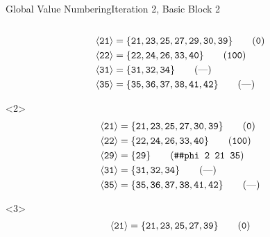 \documentclass{beamer}
\newcommand{\vn}[1]{\ensuremath{\langle\texttt{#1}\rangle}}
\newcommand{\vreg}[1]{\texttt{#1}}
\begin{document}
\begin{frame}[fragile]{Global Value Numbering}{Iteration 2, Basic Block 2}
\begin{columns}[t,onlytextwidth]
\begin{column}{.5\textwidth}
\begin{onlyenv}
        \begin{align*}
          \vn{21} &= \{\vreg{21},
                       \vreg{23},
                       \vreg{25},
                       \vreg{27},
                       \vreg{29},
                       \vreg{30},
                       \vreg{39}\} \tag{\texttt{0}} \\
          \vn{22} &= \{\vreg{22},
                       \vreg{24},
                       \vreg{26},
                       \vreg{33},
                       \vreg{40}\} \tag{\texttt{100}} \\
          \vn{31} &= \{\vreg{31},
                       \vreg{32},
                       \vreg{34}\} \tag{---} \\
          \vn{35} &= \{\vreg{35},
                       \vreg{36},
                       \vreg{37},
                       \vreg{38},
                       \vreg{41},
                       \vreg{42}\} \tag{---}
        \end{align*}
      \end{onlyenv}
      \begin{onlyenv}<2>
        \begin{align*}
          \vn{21} &= \{\vreg{21},
                       \vreg{23},
                       \vreg{25},
                       \vreg{27},
                       \vreg{30},
                       \vreg{39}\} \tag{\texttt{0}} \\
          \vn{22} &= \{\vreg{22},
                       \vreg{24},
                       \vreg{26},
                       \vreg{33},
                       \vreg{40}\} \tag{\texttt{100}} \\
          \vn{29} &= \{\vreg{29}\} \tag{\texttt{\#\#phi 2 21 35}} \\
          \vn{31} &= \{\vreg{31},
                       \vreg{32},
                       \vreg{34}\} \tag{---} \\
          \vn{35} &= \{\vreg{35},
                       \vreg{36},
                       \vreg{37},
                       \vreg{38},
                       \vreg{41},
                       \vreg{42}\} \tag{---}
        \end{align*}
      \end{onlyenv}
      \begin{onlyenv}<3>
        \begin{align*}
          \vn{21} &= \{\vreg{21},
                       \vreg{23},
                       \vreg{25},
                       \vreg{27},
                       \vreg{39}\} \tag{\texttt{0}} \\

\end{align*}
\end{onlyenv}
\end{column}
\end{columns}
\end{frame}
\end{document}
